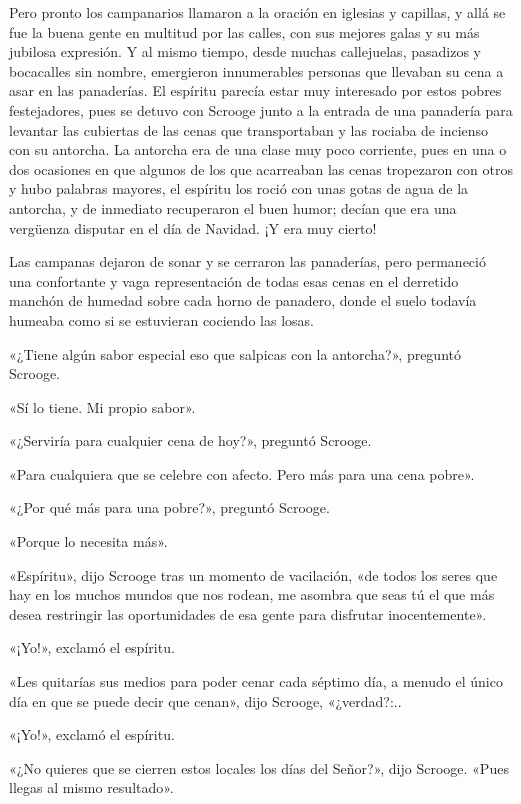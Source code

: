\documentclass{novela}
\begin{document}
 Pero pronto los campanarios llamaron a la oración en iglesias y capillas, y allá se fue la buena gente en multitud por las calles, con sus mejores galas y su más jubilosa expresión. Y al mismo tiempo, desde muchas callejuelas, pasadizos y bocacalles sin nombre, emergieron innumerables personas que llevaban su cena a asar en las panaderías. El espíritu parecía estar muy interesado por estos pobres festejadores, pues se detuvo con Scrooge junto a la entrada de una panadería para levantar las cubiertas de las cenas que transportaban y las rociaba de incienso con su antorcha. La antorcha era de una clase muy poco corriente, pues en una o dos ocasiones en que algunos de los que acarreaban las cenas tropezaron con otros y hubo palabras mayores, el espíritu los roció con unas gotas de agua de la antorcha, y de inmediato recuperaron el buen humor; decían que era una vergüenza disputar en el día de Navidad. ¡Y era muy cierto!

 Las campanas dejaron de sonar y se cerraron las panaderías, pero permaneció una confortante y vaga representación de todas esas cenas en el derretido manchón de humedad sobre cada horno de panadero, donde el suelo todavía humeaba como si se estuvieran cociendo las losas.

 «¿Tiene algún sabor especial eso que salpicas con la antorcha?», preguntó Scrooge.

 «Sí lo tiene. Mi propio sabor».

 «¿Serviría para cualquier cena de hoy?», preguntó Scrooge.

 «Para cualquiera que se celebre con afecto. Pero más para una cena pobre».

 «¿Por qué más para una pobre?», preguntó Scrooge.

 «Porque lo necesita más».

 «Espíritu», dijo Scrooge tras un momento de vacilación, «de todos los seres que hay en los muchos mundos que nos rodean, me asombra que seas tú el que más desea restringir las oportunidades de esa gente para disfrutar inocentemente».

 «¡Yo!», exclamó el espíritu.

 «Les quitarías sus medios para poder cenar cada séptimo día, a menudo el único día en que se puede decir que cenan», dijo Scrooge, «¿verdad?:..

 «¡Yo!», exclamó el espíritu.

 «¿No quieres que se cierren estos locales los días del Señor?», dijo Scrooge. «Pues llegas al mismo resultado».
\end{document}
